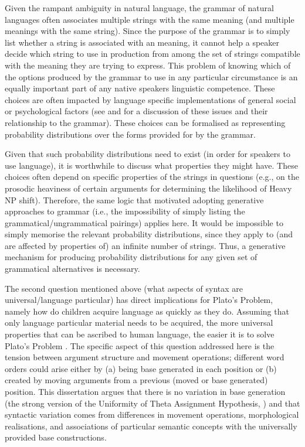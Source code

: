 Given the rampant ambiguity in natural language, the grammar of natural languages often associates multiple strings with the same meaning (and multiple meanings with the same string). Since the purpose of the grammar is to simply list whether a string is associated with an meaning, it cannot help a speaker decide which string to use in production from among the set of strings compatible with the meaning they are trying to express. This problem of knowing which of the options produced by the grammar to use in any particular circumstance is an equally important part of any native speakers linguistic competence. These choices are often impacted by language specific implementations of general social or psychological factors (see \cite{Bresnan.2007,Bresnan.2010,Zeevat.2014} and \cite{Tamminga.2016} for a discussion of these issues and their relationship to the grammar). These choices can be formalised as representing probability distributions over the forms provided for by the grammar.

Given that such probability distributions need to exist (in order for speakers to use language), it is worthwhile to discuss what properties they might have. These choices often depend on specific properties of the strings in questions (e.g., on the prosodic heaviness of certain arguments for determining the likelihood of Heavy NP shift). Therefore, the same logic that motivated adopting generative approaches to grammar (i.e., the impossibility of simply listing the grammatical/ungrammatical pairings) applies here. It would be impossible to simply memorise the relevant probability distributions, since they apply to (and are affected by properties of) an infinite number of strings. Thus, a generative mechanism for producing probability distributions for any given set of grammatical alternatives is necessary.

The second question mentioned above (what aspects of syntax are universal/language particular) has direct implications for Plato's Problem, namely how do children acquire language as quickly as they do. Assuming that only language particular material needs to be acquired, the more universal properties that can be ascribed to human language, the easier it is to solve Plato's Problem \citep{Chomsky.1993}. The specific aspect of this question addressed here is the tension between argument structure and movement operations; different word orders could arise either by (a) being base generated in each position or (b) created by moving arguments from a previous (moved or base generated) position. This dissertation argues that there is no variation in base generation (the strong version of the Uniformity of Theta Assignment Hypothesis, \citealt{Baker.1988}) and that syntactic variation comes from differences in movement operations, morphological realisations, and associations of particular semantic concepts with the universally provided base constructions.

